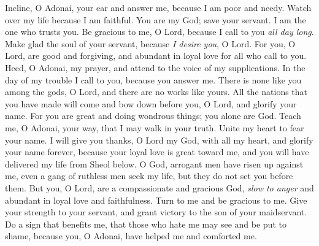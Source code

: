 \begin{biblechapter} %
 Incline, O Adonai, your ear and answer me, 
because I am poor and needy.
\verse Watch over my life because I am faithful. 
You are my God; save your servant. 
I am the one who trusts you.
\verse Be gracious to me, O Lord, 
because I call to you \textit{all day long}.
\verse Make glad the soul of your servant, 
because \textit{I desire you}, O Lord.
\verse For you, O Lord, are good and forgiving, 
and abundant in loyal love for all who call to you.
\verse Heed, O Adonai, my prayer, 
and attend to the voice of my supplications.
\verse In the day of my trouble I call to you, 
because you answer me.
\verse There is none like you among the gods, O Lord, 
and there are no works like yours.
\verse All the nations that you have made will come 
and bow down before you, O Lord, 
and glorify your name.
\verse For you are great and doing wondrous things; 
you alone are God.
\verse Teach me, O Adonai, your way, 
that I may walk in your truth. 
Unite my heart to fear your name.
\verse I will give you thanks, O Lord my God, with all my heart, 
and glorify your name forever,
\verse because your loyal love is great toward me, 
and you will have delivered my life from Sheol below.
\verse O God, arrogant men have risen up against me, 
even a gang of ruthless men seek my life, 
but they do not set you before them.
\verse But you, O Lord, are a compassionate and gracious God, 
\textit{slow to anger} and abundant in loyal love and faithfulness.
\verse Turn to me and be gracious to me. 
Give your strength to your servant, 
and grant victory to the son of your maidservant.
\verse Do a sign that benefits me, 
that those who hate me may see and be put to shame, 
because you, O Adonai, have helped me and comforted me.
\end{biblechapter}

